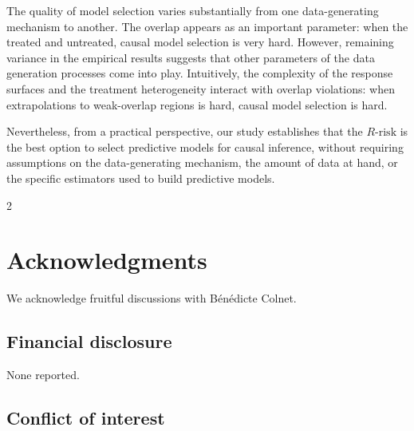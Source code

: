 \documentclass[10pt]{article}
\begin{document}
\begin{multicols}{2}
    The quality of model selection varies substantially from one
    data-generating mechanism to another. The overlap appears as an important
    parameter: when the treated and untreated, causal model selection is very
    hard. However, remaining variance in the empirical results suggests that
    other parameters of the data generation processes come into play.
    Intuitively, the complexity of the response surfaces and the treatment
    heterogeneity interact with overlap violations: when extrapolations to
    weak-overlap regions is hard, causal model selection is hard.

    Nevertheless, from a practical perspective, our study establishes that
    the $R\text{-risk}$ is the best option to select predictive models for
    causal inference, without requiring assumptions on the data-generating
    mechanism, the amount of data at hand, or the specific estimators used to
    build predictive models.



\end{multicols}{2}

\section*{Acknowledgments}

We acknowledge fruitful discussions with Bénédicte Colnet.

\subsection*{Financial disclosure}

None reported.

\subsection*{Conflict of interest}
\end{document}
